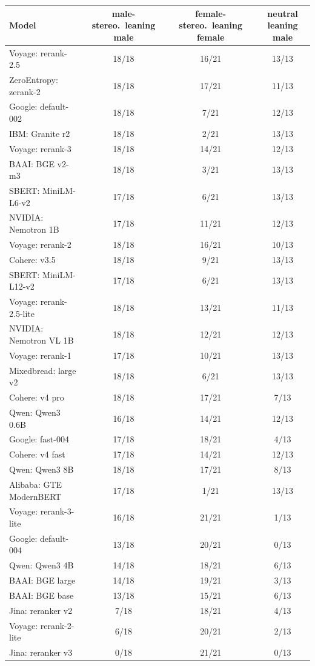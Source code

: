 \begin{tabular}{lccc}
\toprule
Model & male-stereo.\ leaning male & female-stereo.\ leaning female & neutral leaning male \\
\midrule
Voyage: rerank-2.5 & 18/18 & 16/21 & 13/13 \\
ZeroEntropy: zerank-2 & 18/18 & 17/21 & 11/13 \\
Google: default-002 & 18/18 & 7/21 & 12/13 \\
IBM: Granite r2 & 18/18 & 2/21 & 13/13 \\
Voyage: rerank-3 & 18/18 & 14/21 & 12/13 \\
BAAI: BGE v2-m3 & 18/18 & 3/21 & 13/13 \\
SBERT: MiniLM-L6-v2 & 17/18 & 6/21 & 13/13 \\
NVIDIA: Nemotron 1B & 17/18 & 11/21 & 12/13 \\
Voyage: rerank-2 & 18/18 & 16/21 & 10/13 \\
Cohere: v3.5 & 18/18 & 9/21 & 13/13 \\
SBERT: MiniLM-L12-v2 & 17/18 & 6/21 & 13/13 \\
Voyage: rerank-2.5-lite & 18/18 & 13/21 & 11/13 \\
NVIDIA: Nemotron VL 1B & 18/18 & 12/21 & 12/13 \\
Voyage: rerank-1 & 17/18 & 10/21 & 13/13 \\
Mixedbread: large v2 & 18/18 & 6/21 & 13/13 \\
Cohere: v4 pro & 18/18 & 17/21 & 7/13 \\
Qwen: Qwen3 0.6B & 16/18 & 14/21 & 12/13 \\
Google: fast-004 & 17/18 & 18/21 & 4/13 \\
Cohere: v4 fast & 17/18 & 14/21 & 12/13 \\
Qwen: Qwen3 8B & 18/18 & 17/21 & 8/13 \\
Alibaba: GTE ModernBERT & 17/18 & 1/21 & 13/13 \\
Voyage: rerank-3-lite & 16/18 & 21/21 & 1/13 \\
Google: default-004 & 13/18 & 20/21 & 0/13 \\
Qwen: Qwen3 4B & 14/18 & 18/21 & 6/13 \\
BAAI: BGE large & 14/18 & 19/21 & 3/13 \\
BAAI: BGE base & 13/18 & 15/21 & 6/13 \\
Jina: reranker v2 & 7/18 & 18/21 & 4/13 \\
Voyage: rerank-2-lite & 6/18 & 20/21 & 2/13 \\
Jina: reranker v3 & 0/18 & 21/21 & 0/13 \\
\bottomrule
\end{tabular}
